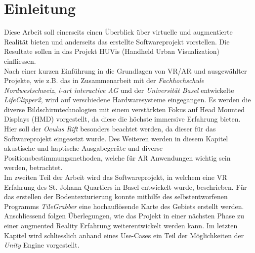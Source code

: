 \chapter{Einleitung}
\vspace{-20pt}
Diese Arbeit soll einerseits einen Überblick über virtuelle und augmentierte Realität bieten und anderseits das erstellte Softwareprojekt vorstellen. Die Resultate sollen in das Projekt HUVis (Handheld Urban Visualization) einfliessen.\\[6pt]
Nach einer kurzen Einführung in die Grundlagen von VR/AR und ausgewählter Projekte, wie z.B. das in Zusammenarbeit mit der \textit{Fachhochschule Nordwestschweiz}, \textit{i-art interactive AG} und der \textit{Universität Basel} entwickelte \textit{LifeClipper2}, wird auf verschiedene Hardwaresysteme eingegangen. Es werden die diverse Bildschirmtechnologien mit einem verstärkten Fokus auf Head Mounted Displays (HMD) vorgestellt, da diese die höchste immersive Erfahrung bieten. Hier soll der \textit{Oculus Rift} besonders beachtet werden, da dieser für das Softwareprojekt eingesetzt wurde. Des Weiteren werden in diesem Kapitel akustische und haptische Ausgabegeräte und diverse Positionsbestimmungsmethoden, welche für AR Anwendungen wichtig sein werden, betrachtet.\\[6pt]
Im zweiten Teil der Arbeit wird das Softwareprojekt, in welchem eine VR Erfahrung des St. Johann Quartiers in Basel entwickelt wurde, beschrieben. Für das erstellen der Bodentexturierung konnte mithilfe des selbstentworfenen Programms \textit{TileGrabber} eine hochauflösende Karte des Gebiets erstellt werden. Anschliessend folgen Überlegungen, wie das Projekt in einer nächsten Phase zu einer augmented Reality Erfahrung weiterentwickelt werden kann. Im letzten Kapitel wird schliesslich anhand eines Use-Cases ein Teil der Möglichkeiten der \textit{Unity} Engine vorgestellt.

